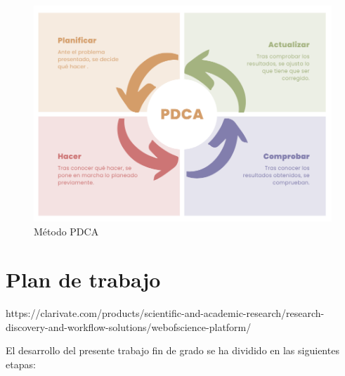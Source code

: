 \begin{figure} [h!]
	\begin{center}
			\includegraphics[width=16cm]{figs/PDCA.png}
		\end{center}
	\caption{Método PDCA} 
\label{fig:PDCA}
\end{figure}


\section{Plan de trabajo}
\label{sec:plantrabajo}https://clarivate.com/products/scientific-and-academic-research/research-discovery-and-workflow-solutions/webofscience-platform/

El desarrollo del presente trabajo fin de grado se ha dividido en las siguientes etapas: 

